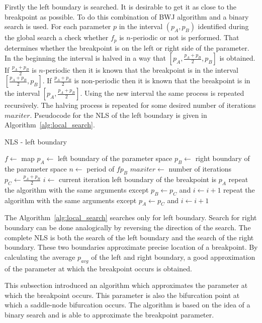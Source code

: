 \par
Firstly the left boundary is searched.
It is desirable to get it as close to the breakpoint as possible.
To do this combination of BWJ algorithm and a binary search is used.
For each parameter $p$ in the interval $(p_{A}, p_{B})$ identified during the global search a check whether $f_{p}$ is $n$-periodic or not is performed.
That determines whether the breakpoint is on the left or right side of the parameter.
In the beginning the interval is halved in a way that $[p_{A}, \frac{p_{A}+p_{B}}{2}, p_{B}]$ is obtained.
If $\frac{p_{A}+p_{B}}{2}$ is $n$-periodic then it is known that the breakpoint is in the interval $[\frac{p_{A}+p_{B}}{2}, p_{B}]$.
If $\frac{p_{A}+p_{B}}{2}$ is non-periodic then it is known that the breakpoint is in the interval $[p_{A}, \frac{p_{A}+p_{B}}{2}]$.
Using the new interval the same process is repeated recursively.
The halving process is repeated for some desired number of iterations $maxiter$.
Pseudocode for the NLS of the left boundary is given in Algorithm~\ref{alg:local_search}.

\begin{algorithm}[!h]
    \caption{NLS - left boundary}
    \label{alg:local_search}
    \begin{algorithmic}[1]
        \Statex $f \gets$ map
        \Statex $p_{A} \gets$ left boundary of the parameter space
        \Statex $p_{B} \gets$ right boundary of the parameter space
        \Statex $n \gets$ period of $f{p_{B}}$
        \Statex $maxiter \gets$ number of iterations
        \State $p_{C} \gets \frac{p_{A}+p_{B}}{2}$
        \State $i \gets$ current iteration
            \State left boundary of the breakpoint is $p_{A}$
        \EndIf
            \State repeat the algorithm with the same arguments except $p_{B} \gets p_{C}$ and $i \gets i+1$
        \Else
            \State repeat the algorithm with the same arguments except $p_{A} \gets p_{C}$ and $i \gets i+1$
        \EndIf
    \end{algorithmic}
\end{algorithm}

\par
The Algorithm~\ref{alg:local_search} searches only for left boundary. Search for right boundary can be done analogically by reversing the direction of the search.
The complete NLS is both the search of the left boundary and the search of the right boundary.
These two boundaries approximate precise location of a breakpoint.
By calculating the average $p_{avg}$ of the left and right boundary, a good approximation of the parameter at which the breakpoint occurs is obtained.
\par
This subsection introduced an algorithm which approximates the parameter at which the breakpoint occurs.
This parameter is also the bifurcation point at which a saddle-node bifurcation occurs.
The algorithm is based on the idea of a binary search and is able to approximate the breakpoint parameter.

